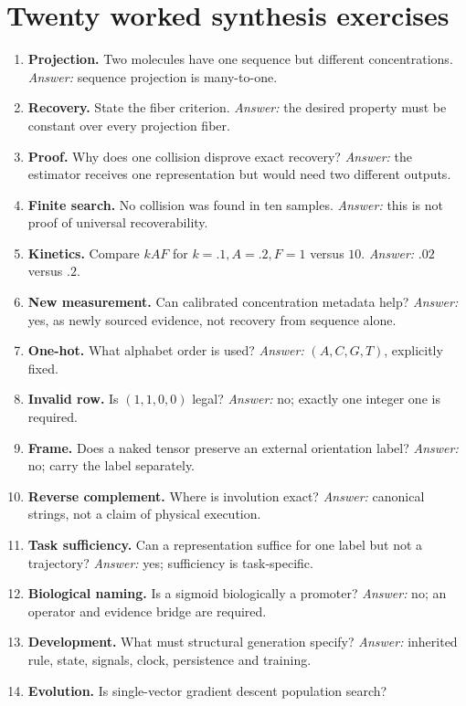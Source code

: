 \section{Twenty worked synthesis exercises}
\begin{enumerate}
\item \textbf{Projection.} Two molecules have one sequence but different
concentrations. \emph{Answer:} sequence projection is many-to-one.
\item \textbf{Recovery.} State the fiber criterion. \emph{Answer:}
the desired property must be constant over every projection fiber.
\item \textbf{Proof.} Why does one collision disprove exact recovery?
\emph{Answer:} the estimator receives one representation but would need two
different outputs.
\item \textbf{Finite search.} No collision was found in ten samples.
\emph{Answer:} this is not proof of universal recoverability.
\item \textbf{Kinetics.} Compare $kAF$ for $k=.1,A=.2,F=1$ versus $10$.
\emph{Answer:} $.02$ versus $.2$.
\item \textbf{New measurement.} Can calibrated concentration metadata help?
\emph{Answer:} yes, as newly sourced evidence, not recovery from sequence alone.
\item \textbf{One-hot.} What alphabet order is used? \emph{Answer:}
$(A,C,G,T)$, explicitly fixed.
\item \textbf{Invalid row.} Is $(1,1,0,0)$ legal? \emph{Answer:} no;
exactly one integer one is required.
\item \textbf{Frame.} Does a naked tensor preserve an external orientation
label? \emph{Answer:} no; carry the label separately.
\item \textbf{Reverse complement.} Where is involution exact?
\emph{Answer:} canonical strings, not a claim of physical execution.
\item \textbf{Task sufficiency.} Can a representation suffice for one label
but not a trajectory? \emph{Answer:} yes; sufficiency is task-specific.
\item \textbf{Biological naming.} Is a sigmoid biologically a promoter?
\emph{Answer:} no; an operator and evidence bridge are required.
\item \textbf{Development.} What must structural generation specify?
\emph{Answer:} inherited rule, state, signals, clock, persistence and training.
\item \textbf{Evolution.} Is single-vector gradient descent population search?

\end{enumerate}
